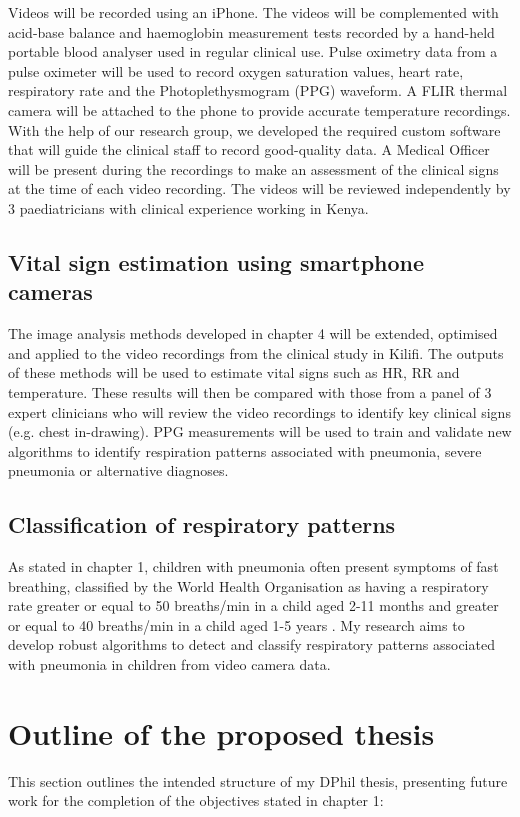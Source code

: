 Videos will be recorded using an iPhone. The videos  will be complemented with acid-base balance and haemoglobin measurement tests recorded by a hand-held portable blood analyser used in regular clinical use. Pulse oximetry data from a pulse oximeter will be used to record oxygen saturation values, heart rate, respiratory rate and the Photoplethysmogram (PPG) waveform. A FLIR thermal camera will be attached to the phone to provide accurate temperature recordings. With the help of our research group, we developed the required custom software that will guide the clinical staff to record good-quality data. A Medical Officer will be present during the recordings to make an assessment of the clinical signs at the time of each video recording. The videos will be reviewed independently by 3 paediatricians with clinical experience working in Kenya. 

\subsection{Vital sign estimation using smartphone cameras}
The image analysis methods developed in chapter 4 will be extended, optimised and applied to the video recordings from the clinical study in Kilifi. The outputs of these methods will be used to estimate vital signs such as HR, RR and temperature. These results will then be compared with those from a panel of 3 expert clinicians who will review the video recordings to identify key clinical signs (e.g. chest in-drawing). PPG measurements will be used to train and validate new algorithms to identify respiration patterns associated with pneumonia, severe pneumonia or alternative diagnoses. 

\subsection{Classification of respiratory patterns}
As stated in chapter 1, children with pneumonia often present symptoms of fast breathing, classified by the World Health Organisation as having a respiratory rate greater or equal to 50 breaths/min in a child aged 2-11 months and greater or equal to 40 breaths/min in a child aged 1-5 years \cite{world2013pocket}. My research aims to develop robust algorithms to detect and classify respiratory patterns associated with pneumonia in children from video camera data. 

\section{Outline of the proposed thesis}
This section outlines the intended structure of my DPhil thesis, presenting future work for the completion of the objectives stated in chapter 1:

